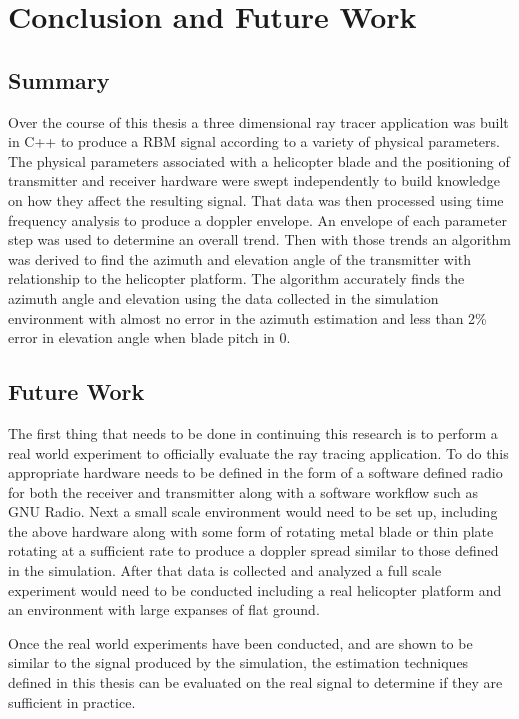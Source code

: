 \chapter{Conclusion and Future Work} \label{ch:conclusion}

\section{Summary}

Over the course of this thesis a three dimensional ray tracer application was built in C++ to produce a RBM signal according to a variety of physical parameters. The physical parameters associated with a helicopter blade and the positioning of transmitter and receiver hardware were swept independently to build knowledge on how they affect the resulting signal. That data was then processed using time frequency analysis to produce a doppler envelope. An envelope of each parameter step was used to determine an overall trend. Then with those trends an algorithm was derived to find the azimuth and elevation angle of the transmitter with relationship to the helicopter platform. The algorithm accurately finds the azimuth angle and elevation using the data collected in the simulation environment with almost no error in the azimuth estimation and less than 2\% error in elevation angle when blade pitch in 0\textdegree.

\section{Future Work}
The first thing that needs to be done in continuing this research is to perform a real world experiment to officially evaluate the ray tracing application. To do this appropriate hardware needs to be defined in the form of a software defined radio for both the receiver and transmitter along with a software workflow such as GNU Radio. Next a small scale environment would need to be set up, including the above hardware along with some form of rotating metal blade or thin plate rotating at a sufficient rate to produce a doppler spread similar to those defined in the simulation. After that data is collected and analyzed a full scale experiment would need to be conducted including a real helicopter platform and an environment with large expanses of flat ground.

Once the real world experiments have been conducted, and are shown to be similar to the signal produced by the simulation, the estimation techniques defined in this thesis can be evaluated on the real signal to determine if they are sufficient in practice.

